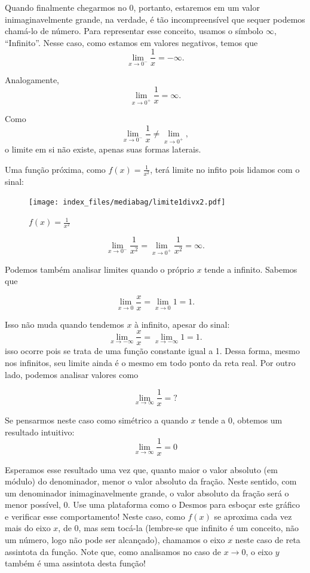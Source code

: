 \documentclass[
  portuguese,
  letterpaper,
  DIV=11,
  numbers=noendperiod]{scrreport}
\begin{document}
Quando finalmente chegarmos no \(0\), portanto, estaremos em um valor
inimaginavelmente grande, na verdade, é tão incompreensível que sequer
podemos chamá-lo de número. Para representar esse conceito, usamos o
símbolo \(\infty\), ``Infinito''. Nesse caso, como estamos em valores
negativos, temos que \[
\lim_{x\rightarrow 0^-} \frac{1}{x} = -\infty.
\]

Analogamente, \[
\lim_{x\rightarrow 0^+} \frac{1}{x} = \infty.
\]

Como \[
\lim_{x\rightarrow 0^-} \frac{1}{x} \neq \lim_{x \rightarrow 0^+},
\] o limite em si não existe, apenas suas formas laterais.

Uma função próxima, como \(f(x) = \frac{1}{x^2}\), terá limite no infito
pois lidamos com o sinal:

\begin{figure}[H]

\caption{\(f(x) = \frac{1}{x^2}\)}

{\centering \texttt{[image: index\_files/mediabag/limite1divx2.pdf]}

}

\end{figure}%

\[
\lim_{x\rightarrow 0^-} \frac{1}{x^2} = \lim_{x\rightarrow 0^+} \frac{1}{x^2} = \infty.
\]

Podemos também analisar limites quando o próprio \(x\) tende a infinito.
Sabemos que

\[
\lim_{x\rightarrow 0} \frac{x}{x} = \lim_{x\rightarrow 0} 1 = 1.
\]

Isso não muda quando tendemos \(x\) à infinito, apesar do sinal: \[
\lim_{x\rightarrow -\infty} \frac{x}{x} = \lim_{x\rightarrow -\infty} 1 = 1.
\] isso ocorre pois se trata de uma função constante igual a 1. Dessa
forma, mesmo nos infinitos, seu limite ainda é o mesmo em todo ponto da
reta real. Por outro lado, podemos analisar valores como

\[
\lim_{x\rightarrow \infty} \frac{1}{x} = ?
\]

Se pensarmos neste caso como simétrico a quando \(x\) tende a \(0\),
obtemos um resultado intuitivo: \[
\lim_{x\rightarrow \infty} \frac{1}{x} = 0
\]

Esperamos esse resultado uma vez que, quanto maior o valor absoluto (em
módulo) do denominador, menor o valor absoluto da fração. Neste sentido,
com um denominador inimaginavelmente grande, o valor absoluto da fração
será o menor possível, 0. Use uma plataforma como o Desmos para esboçar
este gráfico e verificar esse comportamento! Neste caso, como \(f(x)\)
se aproxima cada vez mais do eixo \(x\), de 0, mas sem tocá-la
(lembre-se que infinito é um conceito, não um número, logo não pode ser
alcançado), chamamos o eixo \(x\) neste caso de reta assintota da
função. Note que, como analisamos no caso de \(x\rightarrow0\), o eixo
\(y\) também é uma assintota desta função!
\end{document}
